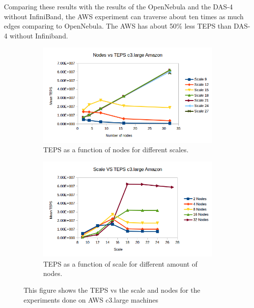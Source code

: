 Comparing these results with the results of the OpenNebula and the DAS-4 without InfiniBand, the AWS experiment can traverse about ten times as much edges comparing to OpenNebula. The AWS has about 50\% less TEPS than DAS-4 without Infiniband.
\begin{figure}[!h]
	\centering
	\begin{subfigure}{.5\textwidth}
		\centering
		\includegraphics[width=\linewidth]{images/nodes_c3_amazon.png}
		\caption{TEPS as a function of nodes for different scales.}
		\label{fig:nodes_c3_amazon}
	\end{subfigure}%
	\begin{subfigure}{.5\textwidth}
		\centering
		\includegraphics[width=\linewidth]{images/scale_c3_amazon.png}
		\caption{TEPS as a function of scale for different amount of nodes.}
		\label{fig:scale_c3_amazon}
	\end{subfigure}
	\caption{This figure shows the TEPS vs the scale and nodes for the experiments done on AWS c3.large machines}
	\label{fig:c3_amazon}
\end{figure}

